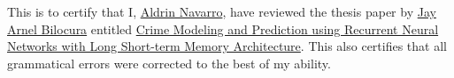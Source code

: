 \begin{certification}
    This is to certify that I, \ul{Aldrin Navarro}, have reviewed the thesis paper
    by \ul{Jay Arnel Bilocura} entitled \ul{Crime Modeling and Prediction using
    Recurrent Neural Networks with Long Short-term Memory Architecture}. This
    also certifies that all grammatical errors were corrected to the best of my
    ability.

    \vspace{2in}
    \par\noindent\makebox[2.5in]{\hrulefill}
    \hfill\makebox[2.5in]{\hrulefill}

    \par\noindent{}
    \hfill{}
    \par\noindent{}

\end{certification}
